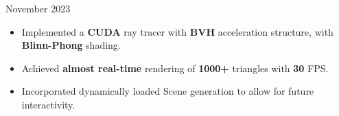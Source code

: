 \documentclass[10pt,a4paper,ragged2e,withhyper]{altacv}
\begin{document}
\begin{paracol}{2}
    





{November 2023 
}{} 
\begin{itemize}
        \item Implemented a \textbf{CUDA} ray tracer with \textbf{BVH} acceleration structure, with \textbf{Blinn-Phong} shading.
        \item Achieved \textbf{almost real-time} rendering of \textbf{1000+} triangles with \textbf{30} FPS.
        \item Incorporated dynamically loaded Scene generation to allow for future interactivity.
\end{itemize}




\end{paracol}
\end{document}
